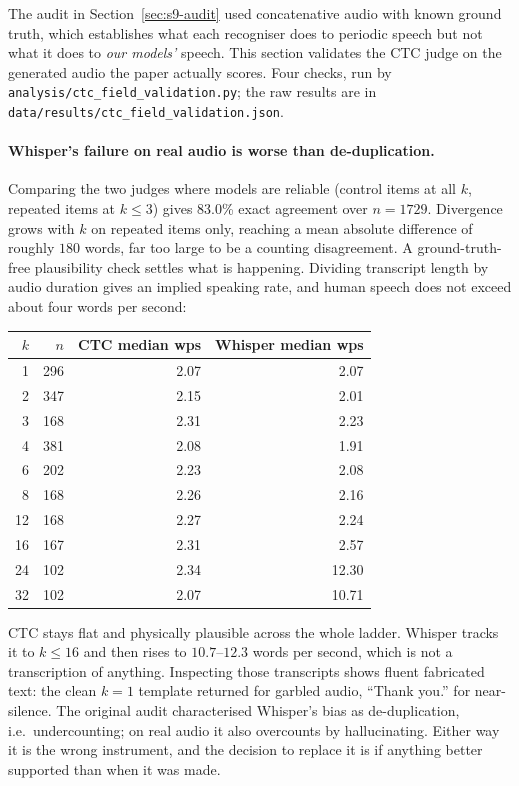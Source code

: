 \documentclass[11pt]{article}
\begin{document}
The audit in Section~\ref{sec:s9-audit} used concatenative audio with known
ground truth, which establishes what each recogniser does to periodic speech but
not what it does to \emph{our models'} speech. This section validates the CTC
judge on the generated audio the paper actually scores. Four checks, run by
\texttt{analysis/ctc\_field\_validation.py}; the raw results are in
\texttt{data/results/ctc\_field\_validation.json}.

\paragraph{Whisper's failure on real audio is worse than de-duplication.}
Comparing the two judges where models are reliable (control items at all $k$,
repeated items at $k\le3$) gives 83.0\% exact agreement over $n=1729$. Divergence
grows with $k$ on repeated items only, reaching a mean absolute difference of
roughly $180$ words, far too large to be a counting disagreement. A
ground-truth-free plausibility check settles what is happening. Dividing
transcript length by audio duration gives an implied speaking rate, and human
speech does not exceed about four words per second:

\begin{center}
\begin{tabular}{rrrr}
\toprule
$k$ & $n$ & CTC median wps & Whisper median wps \\
\midrule
1 & 296 & 2.07 & 2.07 \\
2 & 347 & 2.15 & 2.01 \\
3 & 168 & 2.31 & 2.23 \\
4 & 381 & 2.08 & 1.91 \\
6 & 202 & 2.23 & 2.08 \\
8 & 168 & 2.26 & 2.16 \\
12 & 168 & 2.27 & 2.24 \\
16 & 167 & 2.31 & 2.57 \\
24 & 102 & 2.34 & 12.30 \\
32 & 102 & 2.07 & 10.71 \\
\bottomrule
\end{tabular}
\end{center}

\noindent CTC stays flat and physically plausible across the whole ladder.
Whisper tracks it to $k\le16$ and then rises to $10.7$--$12.3$ words per second,
which is not a transcription of anything. Inspecting those transcripts shows
fluent fabricated text: the clean $k\!=\!1$ template returned for garbled
audio, ``Thank you.'' for near-silence. The original audit characterised
Whisper's bias as de-duplication, i.e.\ undercounting; on real audio it also
overcounts by hallucinating. Either way it is the wrong instrument, and the
decision to replace it is if anything better supported than when it was made.
\end{document}
